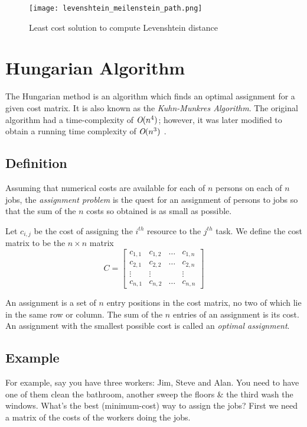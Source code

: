 			\begin{figure}[h!]
				\centering
				\texttt{[image: levenshtein\_meilenstein\_path.png]}
				\caption{Least cost solution to compute Levenshtein distance  \label{levenshtein_path}}
			\end{figure}

	\section{Hungarian Algorithm}
	\label{sec:hungarian}
		The Hungarian method is an algorithm which finds an optimal assignment for a given cost matrix. It is also known as the \emph{Kuhn-Munkres Algorithm}. The original algorithm \cite{kuhn1955hungarian} had a time-complexity of \(\emph{O}(n^4)\); however, it was later modified to obtain a running time complexity of \(\emph{O}(n^3)\) \cite{munkres1957algorithms}.
		
		\subsection{Definition}
			Assuming that numerical costs are available for each of \(n\) persons on each of \(n\) jobs, the \emph{assignment problem} is the quest for an assignment of persons to jobs so that the sum of the \(n\) costs so obtained is as small as possible.
			
			Let \(c_{i,j}\) be the cost of assigning the \(i^{th}\) resource to the \(j^{th}\) task. We define the cost matrix to be the \(n \times n\) matrix
		\[ C =
			 \begin{bmatrix}
			 	c_{1,1} &	c_{1,2} &	\dots &	c_{1,n} \\
			 	c_{2,1} &	c_{2,2} &	\dots &	c_{2,n} \\
			 	\vdots &	\vdots &	&	\vdots \\
			 	c_{n,1} &	c_{n,2} &	\dots &	c_{n,n}
			\end{bmatrix}
		\]
		
			An assignment is a set of \(n\) entry positions in the cost matrix, no two of which lie in the same row or column. The sum of the \(n\) entries of an assignment is its cost. An assignment with the smallest possible cost is called an \emph{optimal assignment}.
		
		\subsection{Example}
			For example, say you have three workers: Jim, Steve and Alan. You need to have one of them clean the bathroom, another sweep the floors \& the third wash the windows. What’s the best (minimum-cost) way to assign the jobs? First we need a matrix of the costs of the workers doing the jobs.

